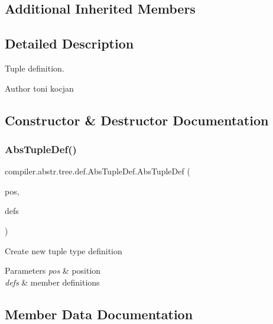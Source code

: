 \subsection*{Additional Inherited Members}


\subsection{Detailed Description}
Tuple definition. \begin{DoxyAuthor}{Author}
toni kocjan 
\end{DoxyAuthor}


\subsection{Constructor \& Destructor Documentation}
\mbox{\label{classcompiler_1_1abstr_1_1tree_1_1def_1_1_abs_tuple_def_a6d11bf4078808721e03332c9a0ec8272}} 
\subsubsection{\texorpdfstring{Abs\+Tuple\+Def()}{AbsTupleDef()}}
{\footnotesize\ttfamily compiler.\+abstr.\+tree.\+def.\+Abs\+Tuple\+Def.\+Abs\+Tuple\+Def (\begin{DoxyParamCaption}\item[{\hyperlink{classcompiler_1_1_position}{Position}}]{pos,  }\item[{Linked\+List$<$ \hyperlink{classcompiler_1_1abstr_1_1tree_1_1def_1_1_abs_def}{Abs\+Def} $>$}]{defs }\end{DoxyParamCaption})}

Create new tuple type definition 
\begin{DoxyParams}{Parameters}
{\em pos} & position \\
\hline
{\em defs} & member definitions \\
\hline
\end{DoxyParams}


\subsection{Member Data Documentation}
\mbox{\label{classcompiler_1_1abstr_1_1tree_1_1def_1_1_abs_tuple_def_a7c764c8a266ea4b139b64f59377a5082}} 
